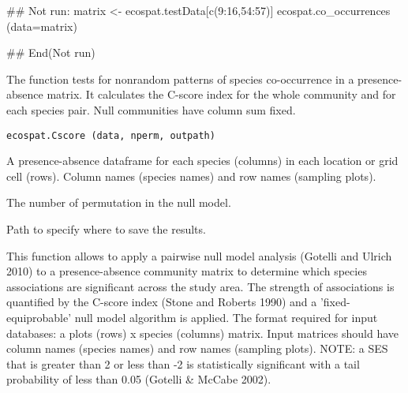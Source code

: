 \documentclass[a4paper]{book}
\begin{document}
%
\begin{Examples}
\begin{ExampleCode}
## Not run: 
matrix <- ecospat.testData[c(9:16,54:57)]
ecospat.co_occurrences (data=matrix)

## End(Not run)
\end{ExampleCode}
\end{Examples}
%
\begin{Description}\relax
The function tests for nonrandom patterns of species co-occurrence in a presence-absence matrix. It calculates the C-score index for the whole community and for each species pair. Null communities have column sum fixed.
\end{Description}
%
\begin{Usage}
\begin{verbatim}
ecospat.Cscore (data, nperm, outpath)
\end{verbatim}
\end{Usage}
%
\begin{Arguments}
\begin{ldescription}
\item[\code{data}] 
A presence-absence dataframe for each species (columns) in each location or grid cell (rows). Column names (species names) and row names (sampling plots).

\item[\code{nperm}] 
The number of permutation in the null model.


\item[\code{outpath}] 
Path to specify where to save the results.


\end{ldescription}
\end{Arguments}
%
\begin{Details}\relax
This function allows to apply a pairwise null model analysis (Gotelli and Ulrich 2010) to a presence-absence community matrix to determine which species associations are significant across the study area. The strength of associations is quantified by the C-score index (Stone and Roberts 1990) and a 'fixed-equiprobable' null model algorithm is applied.
The format required for input databases: a plots (rows) x species (columns) matrix. Input matrices should have column names (species names) and row names (sampling plots). 
NOTE: a SES that is greater than 2 or less than -2 is statistically significant with a tail probability of less than 0.05 (Gotelli \& McCabe 2002). 

\end{Details}
\end{document}
